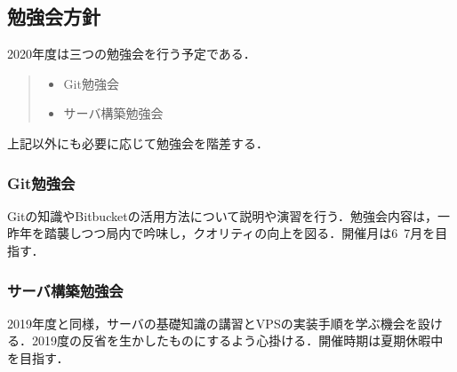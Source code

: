 \subsection*{勉強会方針}


2020年度は三つの勉強会を行う予定である．
\begin{quote}
 \begin{itemize}
\item Git勉強会
\item サーバ構築勉強会
 \end{itemize}
\end{quote}
上記以外にも必要に応じて勉強会を階差する．

\subsubsection*{Git勉強会}
Gitの知識やBitbucketの活用方法について説明や演習を行う．勉強会内容は，一昨年を踏襲しつつ局内で吟味し，クオリティの向上を図る．開催月は6~7月を目指す．
\subsubsection*{サーバ構築勉強会}
2019年度と同様，サーバの基礎知識の講習とVPSの実装手順を学ぶ機会を設ける．2019度の反省を生かしたものにするよう心掛ける．開催時期は夏期休暇中を目指す．


